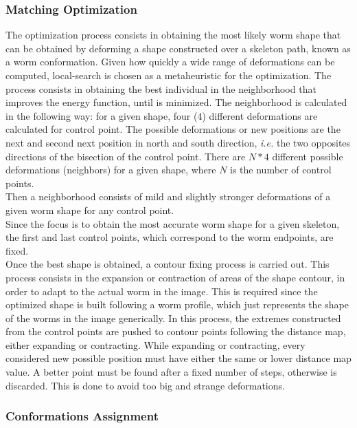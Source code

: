 \subsubsection*{Matching Optimization}

The optimization process consists in obtaining the most likely worm shape that can be
obtained by deforming a shape constructed over a skeleton path, known as a 
worm conformation. Given how quickly a wide range of deformations can 
be computed, local-search is chosen as a metaheuristic for the optimization.
The process consists in obtaining the
best individual in the neighborhood that improves the energy function, until is 
minimized.
The neighborhood is calculated in the following way:
for a given shape, four (4) different deformations are calculated for control point.
The possible deformations or new positions are the
next and second next position in north and south direction, \emph{i.e. }the two opposites
directions of the bisection of the control point.
There are $N*4$ different possible deformations (neighbors) for a given shape,
where $N$ is the number of control points.\\ 
Then a neighborhood consists of mild and slightly stronger deformations of a given
worm shape for any control point.\\ Since the focus is to obtain the most accurate worm 
shape for a given skeleton, the
first and last control points, which correspond to the worm endpoints, are fixed.\\

Once the best shape is obtained, a contour fixing process is carried out. This
process consists in the expansion or contraction of areas of the shape contour, 
in order to adapt to the actual worm in the image. 
This is required since the optimized shape is built 
following a worm profile, which just represents the shape of 
the worms in the image generically. In this process, the extremes constructed from the control points are pushed
to contour points following the distance map, either expanding or contracting. While
expanding or contracting, every considered new possible position must have either the 
same or lower distance map value. A better point must be found after a fixed number
of steps, otherwise is discarded. This is done to avoid too big and strange deformations.

\subsubsection*{Conformations Assignment}

